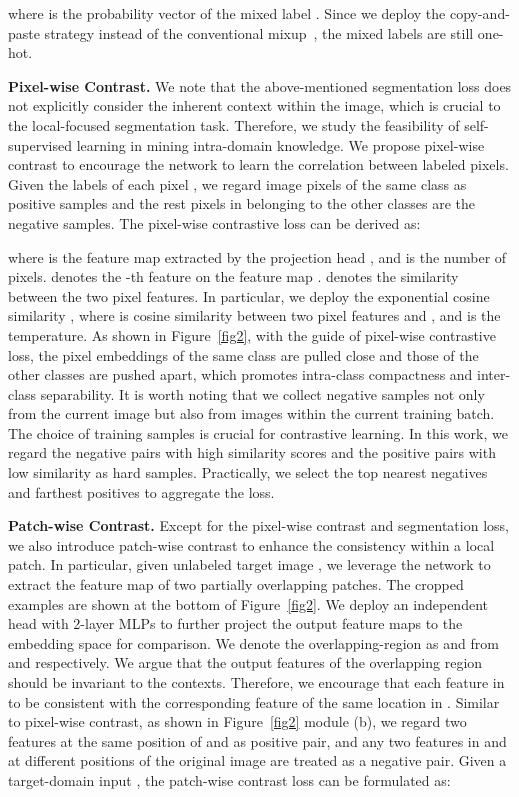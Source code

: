 \documentclass[10pt,twocolumn,letterpaper]{article}
\begin{document}
where  is the probability vector of the mixed label . Since we deploy the copy-and-paste strategy instead of the conventional mixup~\cite{zhang2017mixup}, the mixed labels are still one-hot.

\noindent\textbf{Pixel-wise Contrast.} We note that the above-mentioned segmentation loss does not explicitly consider the inherent context within the image, which is crucial to the local-focused segmentation task. Therefore, we study the feasibility of self-supervised learning in mining intra-domain knowledge.  We propose pixel-wise contrast to encourage the network to learn the correlation between labeled pixels.
Given the labels of each pixel , we regard image pixels of the same class  as positive samples and the rest pixels in  belonging to the other classes are the negative samples. The pixel-wise contrastive loss can be derived as:

where  is the feature map extracted by the projection head , and  is the number of pixels.  denotes the -th feature on the feature map .
 denotes the similarity between the two pixel features. In particular, we deploy 
the exponential cosine similarity , where  is cosine similarity between two pixel features  and , and  is the temperature. 
As shown in Figure~\ref{fig2}, with the guide of pixel-wise contrastive loss, the pixel embeddings of the same class are pulled close and those of the other classes are pushed apart, which promotes intra-class compactness and inter-class separability. 
It is worth noting that we collect negative samples not only from the current image but also from images within the current training batch.
The choice of training samples is crucial for contrastive learning. In this work, we regard the negative pairs with high similarity scores and the positive pairs with low similarity as hard samples. Practically, we select the top  nearest negatives and  farthest positives to aggregate the loss.

\noindent\textbf{Patch-wise Contrast.} 
Except for the pixel-wise contrast and segmentation loss, we also introduce patch-wise contrast to enhance the consistency within a local patch. 
In particular, given unlabeled target image , we leverage the network  to extract the feature map of two partially overlapping patches. The cropped examples are shown at the bottom of Figure~\ref{fig2}. 
We deploy an independent head  with 2-layer MLPs to further project the output feature maps to the embedding space for comparison. We denote the overlapping-region as  and  from  and  respectively. We argue that the output features of the overlapping region should be invariant to the contexts. Therefore, we encourage that each feature in  to be consistent with the corresponding feature of the same location in . 
Similar to pixel-wise contrast, as shown in Figure~\ref{fig2} module (b), we regard two features at the same position of  and  as positive pair, and any two features in  and  at different positions of the original image are treated as a negative pair. 
Given a target-domain input , the patch-wise contrast loss can be formulated as:
\end{document}
